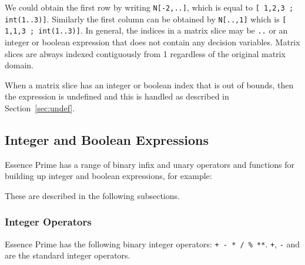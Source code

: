 \documentclass[a4paper]{article}
\newcommand{\eprime}{{\sc Essence Prime}\xspace}
\begin{document}
We could obtain the first row by writing \texttt{N[-2,..]}, which is equal to \texttt{[ 1,2,3 ; int(1..3)]}. 
Similarly the first column can be obtained by 
\texttt{N[..,1]} which is \texttt{[ 1,1,3 ; int(1..3)]}.  In general, the indices in a matrix slice may be \texttt{..} or 
an integer or boolean expression that does not contain any decision variables. 
Matrix slices are always indexed contiguously from 1 regardless of the original matrix
domain. 

When a matrix slice has an integer or boolean index that is out of bounds, then
the expression is undefined and this is handled as described in Section~\ref{sec:undef}.



\subsection{Integer and Boolean Expressions}\label{sec:int-bool-expressions}

\eprime has a range of binary infix and unary operators and functions for building up 
integer and boolean expressions, for example:


These are described in the following subsections. 

\subsubsection{Integer Operators}

\eprime has the following binary integer 
operators: {\tt + - * / \% **}. {\tt +}, {\tt -} and {\tt *} are the standard
integer operators. 
\end{document}
